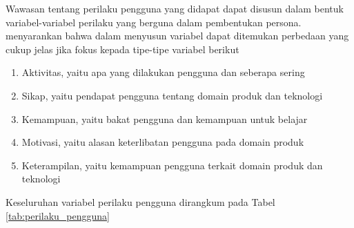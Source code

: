 Wawasan tentang perilaku pengguna yang didapat dapat disusun dalam bentuk variabel-variabel perilaku yang berguna dalam pembentukan persona. \textcite{cooper2014face} menyarankan bahwa dalam menyusun variabel dapat ditemukan perbedaan yang cukup jelas jika fokus kepada tipe-tipe variabel berikut
\begin{enumerate}
  \item Aktivitas, yaitu apa yang dilakukan pengguna dan seberapa sering 
  \item Sikap, yaitu pendapat pengguna tentang domain produk dan teknologi
  \item Kemampuan, yaitu bakat pengguna dan kemampuan untuk belajar
  \item Motivasi, yaitu alasan keterlibatan pengguna pada domain produk 
  \item Keterampilan, yaitu kemampuan pengguna terkait domain produk dan teknologi
\end{enumerate}

Keseluruhan variabel perilaku pengguna dirangkum pada Tabel \ref{tab:perilaku_pengguna}

